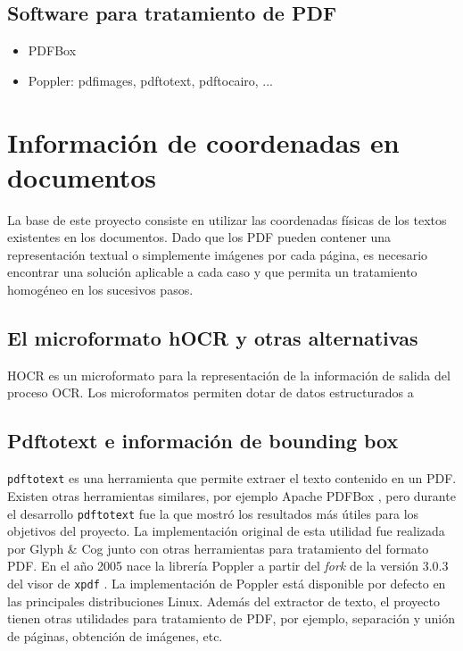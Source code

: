 \subsection{Software para tratamiento de PDF}

\begin{itemize}
    \item PDFBox
    \item Poppler: pdfimages, pdftotext, pdftocairo, ...
\end{itemize}

\section{Información de coordenadas en documentos}

La base de este proyecto consiste en utilizar las coordenadas físicas de los textos existentes en los documentos. Dado que los PDF pueden contener una representación textual o simplemente imágenes por cada página, es necesario encontrar una solución aplicable a cada caso y que permita un tratamiento homogéneo en los sucesivos pasos.

\subsection{El microformato hOCR y otras alternativas}

HOCR es un microformato para la representación de la información de salida del proceso OCR. Los microformatos permiten dotar de datos estructurados a 

\subsection{Pdftotext e información de bounding box}

\verb|pdftotext| es una herramienta que permite extraer el texto contenido en un PDF. Existen otras herramientas similares, por ejemplo Apache PDFBox \cite{the_apache_software_foundation_apache_nodate}, pero durante el desarrollo \verb|pdftotext| fue la que mostró los resultados más útiles para los objetivos del proyecto. La implementación original de esta utilidad fue realizada por Glyph \& Cog \cite{glyph__cog_llc_glyph_nodate-1} junto con otras herramientas para tratamiento del formato PDF. En el año 2005 nace la librería Poppler a partir del \emph{fork} de la versión 3.0.3 del visor de \verb|xpdf| \cite{kristian_hogsberg_poppler_2012}. La implementación de Poppler está disponible por defecto en las principales distribuciones Linux. Además del extractor de texto, el proyecto tienen otras utilidades para tratamiento de PDF, por ejemplo, separación y unión de páginas, obtención de imágenes, etc.

